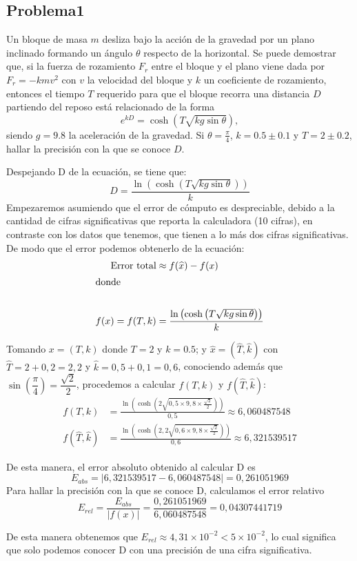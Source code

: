 \documentclass[12pt, a4paper]{article}%
\begin{document}
\subsection*{Problema1}
Un bloque de masa \( m \) desliza bajo la acción de la gravedad por un plano inclinado formando un ángulo \( \theta \) respecto de la horizontal. Se puede demostrar que, si la fuerza de rozamiento \( F_r \) entre el bloque y el plano viene dada por \( F_r = -k m v^2 \) con \( v \) la velocidad del bloque y \( k \) un coeficiente de rozamiento, entonces el tiempo \( T \) requerido para que el bloque recorra una distancia \( D \) partiendo del reposo está relacionado de la forma
\[
e^{kD} = \cosh\left(T \sqrt{k g \sin \theta}\right),
\]
siendo \( g = 9.8 \) la aceleración de la gravedad. Si \( \theta = \frac{\pi}{4} \), \( k = 0.5 \pm 0.1 \) y \( T = 2 \pm 0.2 \), hallar la precisión con la que se conoce \( D \).
\begin{solution}
    Despejando D de la ecuación, se tiene que:
    \[ D=\frac{\ln{\left(\cosh{\left(T\sqrt{kg\sin{\theta}}\right)}\right)}}{k}
    \]
    Empezaremos asumiendo que el error de cómputo es despreciable, debido a la cantidad de cifras significativas que reporta la calculadora (10 cifras), en contraste con los datos que tenemos, que tienen a lo más dos cifras significativas. De modo que el error podemos obtenerlo de la ecuación:
    \begin{align*}
    \text{Error total}&\approx f(\widehat{x})-f(x)\\
    \intertext{donde}\\ f(x)=f(T,k)&=\frac{\ln{\left(\cosh{\left(T\sqrt{kg\sin{\theta}}\right)}\right)}}{k}
    \end{align*}
    
    Tomando $x=(T,k)$ donde $T=2$ y $k=0.5$; y $\widehat{x}=(\widehat{T},\widehat{k})$ con $\widehat{T}=2+0,2=2,2$ y $\widehat{k}=0,5+0,1=0,6$, conociendo además que $\sin\left(\dfrac{\pi}{4}\right)=\dfrac{\sqrt{2}}
    {2}$, procedemos a calcular $f(T,k)$ y $f(\widehat{T},\widehat{k})$:
    \begin{align*}
    f(T,k)&=\frac{\ln{\left(\cosh{\left(2\sqrt{0,5\times9,8\times\frac{\sqrt{2}}{2}}\right)}\right)}}{0,5}\approx 6,060487548\\    f(\widehat{T},\widehat{k})&=\frac{\ln{\left(\cosh{\left(2,2\sqrt{0,6\times9,8\times\frac{\sqrt{2}}{2}}\right)}\right)}}{0,6}\approx 6,321539517
    \end{align*}

    De esta manera, el error absoluto obtenido al calcular D es
    \[
    E_{abs}=|6,321539517-6,060487548|=0,261051969
    \] Para hallar la precisión con la que se conoce D, calculamos el error relativo
    \[
    E_{rel}=\dfrac{E_{abs}}{|f(x)|}=\dfrac{0,261051969}{6,060487548}=0,04307441719
    \]
    
    De esta manera obtenemos que $E_{rel}\approx 4,31\times10^{-2}<5\times10^{-2}$, lo cual significa que solo podemos conocer D con una precisión de una cifra significativa.

    \end{solution}
\end{document}

